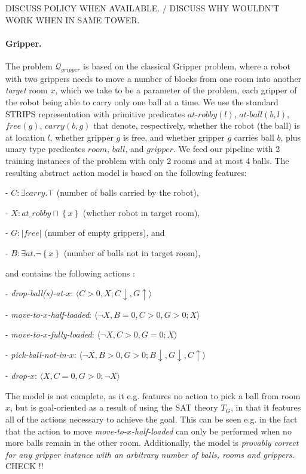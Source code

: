 \documentclass[letterpaper]{article} %
\newcommand{\tuple}[1]{\ensuremath{\langle #1 \rangle}}
\newcommand{\set}[1]{\ensuremath{\left\{#1 \right\}}}
\newcommand{\abs}[1]{\ensuremath{\left\vert{#1}\right\vert}}
\newcommand{\Q}{\mathcal{Q}}
\begin{document}
DISCUSS POLICY WHEN AVAILABLE. / 
DISCUSS WHY WOULDN'T WORK WHEN IN SAME TOWER.


\paragraph{Gripper.}
The problem $\Q_{gripper}$ is based on the classical Gripper problem, where a robot with two grippers needs to 
move a number of blocks from one room into another \emph{target} room $x$, which we take to be a parameter of the problem,
each gripper of the robot being able to carry only one ball at a time.
We use the standard STRIPS representation with primitive predicates $at\text{-}robby(l)$, $at\text{-}ball(b, l)$, $free(g)$, $carry(b, g)$ that denote,
respectively, whether the robot (the ball) is at location $l$, whether gripper $g$ is free, and whether gripper $g$ carries ball $b$,
plus unary type predicates $room$, $ball$, and $gripper$.
%
We feed our pipeline with 2 training instances of the problem with only 2 rooms and at most 4 balls.
The resulting abstract action model is based on the following features:

- $C: \exists carry . \top$ (number of balls carried by the robot), 

- $X: at\_robby \sqcap \set{x}$ (whether robot in target room),

- $G: \abs{free}$ (number of empty grippers), and

- $B: \exists at . \neg \set{x}$ (number of balls not in target room),


\noindent and contains the following actions :

- \emph{drop-ball(s)-at-$x$}: \tuple{C>0, X;  C\downarrow, G \uparrow}

- \emph{move-to-$x$-half-loaded}: \tuple{\neg X, B=0, C>0, G>0;   X}

- \emph{move-to-$x$-fully-loaded}: \tuple{\neg X, C>0, G=0;   X}

- \emph{pick-ball-not-in-$x$}: \tuple{\neg X, B > 0, G > 0;   B \downarrow, G \downarrow, C\uparrow}

- \emph{drop-$x$}: \tuple{X, C=0, G > 0;   \neg X}


The model is not complete, as it e.g. features no action to pick a ball from room $x$,
but is goal-oriented as a result of using the SAT theory $T_G$, in that it features all of the actions
necessary to achieve the goal.
This can be seen e.g. in the fact that the action to move \emph{move-to-$x$-half-loaded}
can only be performed when no more balls remain in the other room.
Additionally, the model is \emph{provably correct for any gripper instance with an arbitrary number of balls, 
rooms and grippers}. CHECK !!
\end{document}
